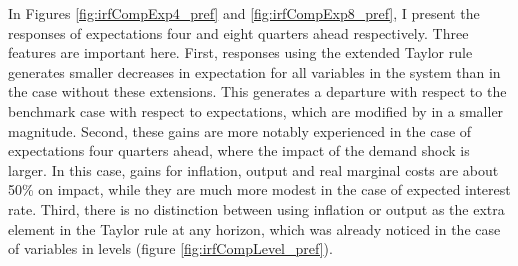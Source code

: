 \documentclass[12pt]{article}
\numberwithin{equation}{section}
\begin{document}
In Figures \ref{fig:irfCompExp4_pref} and \ref{fig:irfCompExp8_pref}, I present the responses of expectations four and eight quarters ahead respectively. Three features are important here. First, responses using the extended Taylor rule generates smaller decreases in expectation for all variables in the system than in the case without these extensions. This generates a departure with respect to the benchmark case with respect to expectations, which are modified by in a smaller magnitude. Second, these gains are more notably experienced in the case of expectations four quarters ahead, where the impact of the demand shock is larger. In this case, gains for inflation, output and real marginal costs are about 50\% on impact, while they are much more modest in the case of expected interest rate. Third, there is no distinction between using inflation or output as the extra element in the Taylor rule at any horizon, which was already noticed in the case of variables in levels (figure \ref{fig:irfCompLevel_pref}).

\end{document}
